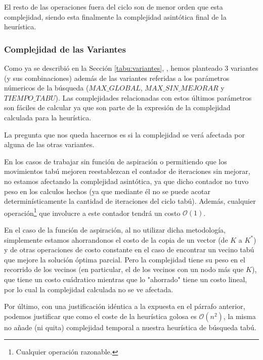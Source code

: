 \par El resto de las operaciones fuera del ciclo son de menor orden que
    esta complejidad, siendo esta finalmente la complejidad asint\'otica
    final de la heur\'istica.

\subsubsection{Complejidad de las Variantes\label{tabu:compl:variantes}}
\par Como ya se describi\'o en la Secci\'on \ref{tabu:variantes},
    \emph{}, hemos planteado 3 variantes (y sus combinaciones)
    adem\'as de las variantes referidas a los par\'ametros n\'umericos
    de la b\'usqueda ($MAX\_GLOBAL$, $MAX\_SIN\_MEJORAR$ y $TIEMPO\_TABU$).
    Las complejidades relacionadas con estos \'ultimos par\'ametros son
    f\'aciles de calcular ya que son parte de la expresi\'on de la complejidad
    calculada para la heur\'istica.

\par La pregunta que nos queda hacernos es si la complejidad se ver\'a
    afectada por alguna de las otras variantes.

\par En los casos de trabajar sin funci\'on de aspiraci\'on o permitiendo
    que los movimientos tab\'u mejoren reestablezcan el contador de
    iteraciones sin mejorar, no estamos afectando la complejidad asint\'otica,
    ya que dicho contador no tuvo peso en los calculos hechos (ya
    que mediante \'el no se puede acotar determin\'isticamente la cantidad
    de iteraciones del ciclo tab\'u). Adem\'as, cualquier operaci\'on\footnote{%
    Cualquier operaci\'on razonable.} que involucre a este contador tendr\'a un 
    costo $\mathcal O(1)$. 

\par En el caso de la funci\'on de aspiraci\'on, al
    no utilizar dicha metodolog\'ia, simplemente estamos ahorrandonos el costo
    de la copia de un vector (de $K$ a $K^*$) y de otras operaciones de costo
    constante en el caso de encontrar un vecino tab\'u que mejore la soluci\'on
    \'optima parcial. Pero la complejidad tiene su peso en el recorrido de los
    vecinos (en particular, el de los vecinos con un nodo m\'as que $K$), que
    tiene un costo cu\'adratico mientras que lo "ahorrado" tiene un costo
    lineal, por lo cual la complejidad calculada no se ve afectada.

\par Por \'ultimo, con una justificaci\'on id\'entica a la expuesta en el
    p\'arrafo anterior, podemos justificar que como el coste de la heur\'istica
    golosa es $\mathcal O(n^2)$, la misma no a\~nade (ni quita) complejidad
    temporal a nuestra heur\'istica de b\'usqueda tab\'u.
